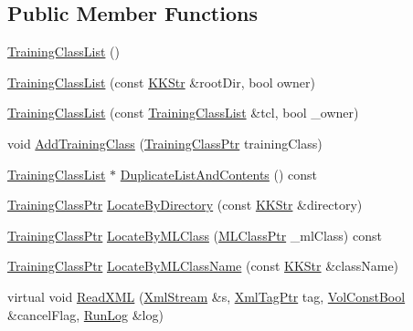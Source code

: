 \subsection*{Public Member Functions}
\begin{DoxyCompactItemize}
\item 
\hyperlink{class_k_k_m_l_l_1_1_training_class_list_aaa10941ac9eff5689e8a1a28b270cf34}{Training\+Class\+List} ()
\item 
\hyperlink{class_k_k_m_l_l_1_1_training_class_list_a26c441eab008d63335a7ed9d05e60d1c}{Training\+Class\+List} (const \hyperlink{class_k_k_b_1_1_k_k_str}{K\+K\+Str} \&root\+Dir, bool owner)
\item 
\hyperlink{class_k_k_m_l_l_1_1_training_class_list_ae9df77167978942ab1cc3451160229db}{Training\+Class\+List} (const \hyperlink{class_k_k_m_l_l_1_1_training_class_list}{Training\+Class\+List} \&tcl, bool \+\_\+owner)
\item 
void \hyperlink{class_k_k_m_l_l_1_1_training_class_list_a906b883f4851afe49cb6c6da66719a46}{Add\+Training\+Class} (\hyperlink{namespace_k_k_m_l_l_aee99044bdeeb0a43cdc845c2c01b1c14}{Training\+Class\+Ptr} training\+Class)
\item 
\hyperlink{class_k_k_m_l_l_1_1_training_class_list}{Training\+Class\+List} $\ast$ \hyperlink{class_k_k_m_l_l_1_1_training_class_list_a736627853cd187aced3dd01b37c0e1a4}{Duplicate\+List\+And\+Contents} () const 
\item 
\hyperlink{namespace_k_k_m_l_l_aee99044bdeeb0a43cdc845c2c01b1c14}{Training\+Class\+Ptr} \hyperlink{class_k_k_m_l_l_1_1_training_class_list_a6d1dd1bd472883d4e17f4c2ec7815b92}{Locate\+By\+Directory} (const \hyperlink{class_k_k_b_1_1_k_k_str}{K\+K\+Str} \&directory)
\item 
\hyperlink{namespace_k_k_m_l_l_aee99044bdeeb0a43cdc845c2c01b1c14}{Training\+Class\+Ptr} \hyperlink{class_k_k_m_l_l_1_1_training_class_list_a4cbbeba5f80d7664531de6b0db96ea8e}{Locate\+By\+M\+L\+Class} (\hyperlink{namespace_k_k_m_l_l_ac272393853d59e72e8456f14cd6d8c23}{M\+L\+Class\+Ptr} \+\_\+ml\+Class) const 
\item 
\hyperlink{namespace_k_k_m_l_l_aee99044bdeeb0a43cdc845c2c01b1c14}{Training\+Class\+Ptr} \hyperlink{class_k_k_m_l_l_1_1_training_class_list_a16eb70a83cb72864a82e068d5339b395}{Locate\+By\+M\+L\+Class\+Name} (const \hyperlink{class_k_k_b_1_1_k_k_str}{K\+K\+Str} \&class\+Name)
\item 
virtual void \hyperlink{class_k_k_m_l_l_1_1_training_class_list_a5bbbf9ce197bb385d97e3351457e7195}{Read\+X\+ML} (\hyperlink{class_k_k_b_1_1_xml_stream}{Xml\+Stream} \&s, \hyperlink{namespace_k_k_b_a9253a3ea8a5da18ca82be4ca2b390ef0}{Xml\+Tag\+Ptr} tag, \hyperlink{namespace_k_k_b_a7d390f568e2831fb76b86b56c87bf92f}{Vol\+Const\+Bool} \&cancel\+Flag, \hyperlink{class_k_k_b_1_1_run_log}{Run\+Log} \&log)

\end{DoxyCompactItemize}

